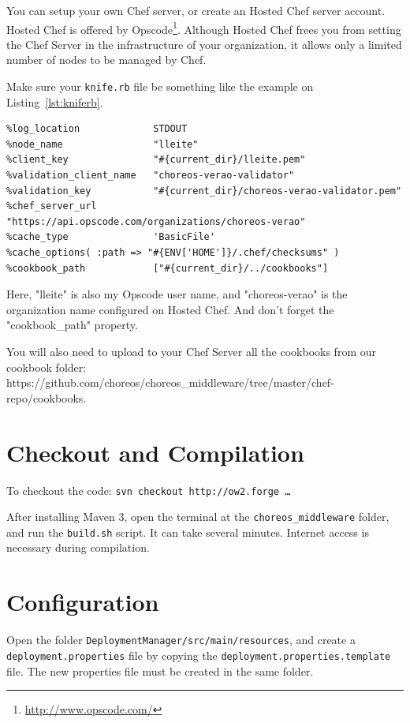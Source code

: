 \documentclass[a4paper, 10pt]{article}
\begin{document}
You can setup your own Chef server, or create an Hosted Chef server account. Hosted Chef is offered by Opscode\footnote{\url{http://www.opscode.com/}}. Although Hosted Chef frees you from setting the Chef Server in the infrastructure of your organization, it allows only a limited number of nodes to be managed by Chef.

Make sure your \texttt{knife.rb} file be something like the example on Listing~\ref{lst:kniferb}.

{\footnotesize
\begin{lstlisting}[caption=knife.rb example,label=lst:kniferb] 
%log_level                :info 
%log_location             STDOUT 
%node_name                "lleite" 
%client_key               "#{current_dir}/lleite.pem" 
%validation_client_name   "choreos-verao-validator" 
%validation_key           "#{current_dir}/choreos-verao-validator.pem" 
%chef_server_url          "https://api.opscode.com/organizations/choreos-verao" 
%cache_type               'BasicFile' 
%cache_options( :path => "#{ENV['HOME']}/.chef/checksums" ) 
%cookbook_path            ["#{current_dir}/../cookbooks"] 
\end{lstlisting}
}

Here, "lleite" is also my Opscode user name, and "choreos-verao" is the organization name configured on Hosted Chef. And don't forget the "cookbook\_path" property.

You will also need to upload to your Chef Server all the cookbooks from our cookbook folder: https://github.com/choreos/choreos\_middleware/tree/master/chef-repo/cookbooks.


\section{Checkout and Compilation}

To checkout the code: \texttt{svn checkout http://ow2.forge \dots}

After installing Maven 3, open the terminal at the \texttt{choreos\_middleware} folder, and run the \texttt{build.sh} script. It can take several minutes. Internet access is necessary during compilation.

\section{Configuration}

Open the folder \texttt{DeploymentManager/src/main/resources}, and create a \texttt{deployment.properties} file by copying the \texttt{deployment.properties.template} file. The new properties file must be created in the same folder.
\end{document}
